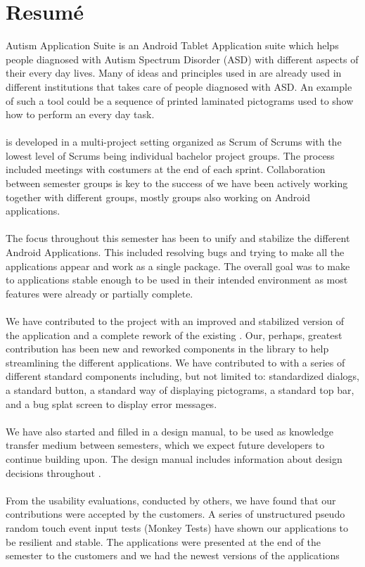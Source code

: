 \chapter{Resumé}
\giraf Autism Application Suite is an Android Tablet Application suite which helps people diagnosed with Autism Spectrum Disorder (ASD) with different aspects of their every day lives. Many of ideas and principles used in \giraf are already used in different institutions that takes care of people diagnosed with ASD. An example of such a tool could be a sequence of printed laminated pictograms used to show how to perform an every day task.       
\\\\
\giraf is developed in a multi-project setting organized as Scrum of Scrums with the lowest level of Scrums being individual bachelor project groups. The process included meetings with costumers at the end of each sprint. Collaboration between semester groups is key to the success of \giraf we have been actively working together with different groups, mostly groups also working on Android applications.  
\\\\
The focus throughout this semester has been to unify and stabilize the different \giraf Android Applications. This included resolving bugs and trying to make all the applications appear and work as a single package. The overall goal was to make to applications stable enough to be used in their intended environment as most features were already or partially complete.   
\\\\
We have contributed to the project with an improved and stabilized version of the \giraf \launcher application and a complete rework of the existing \giraf \ct. Our, perhaps, greatest contribution has been new and reworked components in the \gc library to help streamlining the different applications. We have contributed to \gc with a series of different standard components including, but not limited to: standardized dialogs, a standard button, a standard way of displaying pictograms, a standard top bar, and a bug splat screen to display error messages.
\\\\
We have also started and filled in a design manual, to be used as knowledge transfer medium between semesters, which we expect future \giraf developers to continue building upon. The design manual includes information about design decisions throughout \giraf.  
\\\\
From the usability evaluations, conducted by others, we have found that our contributions were accepted by the customers. A series of unstructured pseudo random touch event input tests (Monkey Tests) have shown our applications to be resilient and stable. The applications were presented at the end of the semester to the customers and we had the newest versions of the applications 

